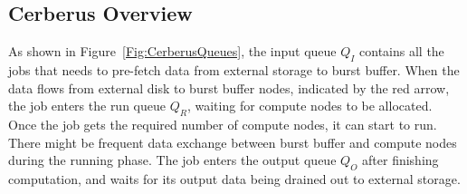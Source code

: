 
\subsection{Cerberus Overview}
As shown in Figure~\ref{Fig:CerberusQueues},
the input queue $Q_I$ contains all the jobs that
needs to pre-fetch data from external storage to burst buffer.
When the data flows from external disk
to burst buffer nodes, indicated by the red arrow, the job enters the run queue $Q_R$, 
waiting for compute nodes to be allocated.
Once the job gets the required number of compute nodes, it can start to run.
There might be frequent data exchange between burst buffer and compute nodes during the running phase. 
The job enters the output queue $Q_O$ after finishing computation, 
and waits for its output data being drained out to external storage. 

